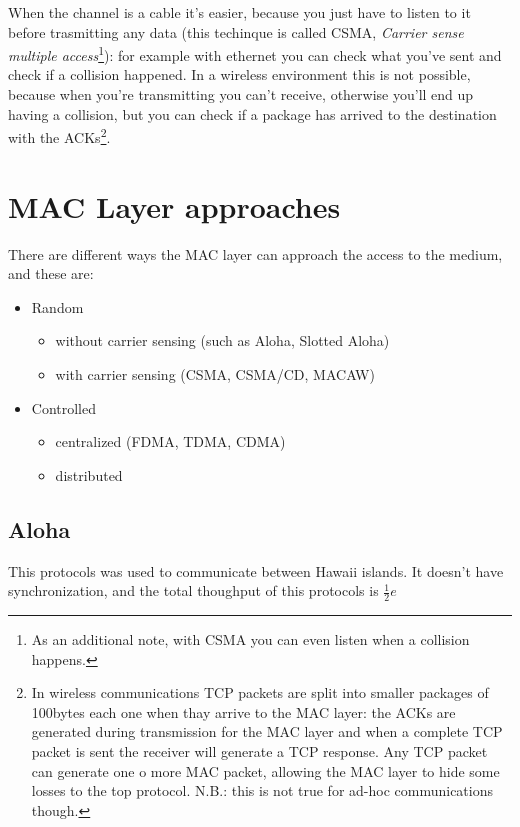 When the channel is a cable it's easier, because you just have to listen to it
before trasmitting any data (this techinque is called CSMA, \textit{Carrier
  sense  multiple access}\footnote{As an additional note, with CSMA you can even listen  when a collision happens.}): for example with ethernet you can check what you've sent and check if a collision happened. In a wireless environment this is not possible, because when you're transmitting you can't receive, otherwise you'll end up having a collision, but you can check if a package has arrived to the destination with the ACKs\footnote{
  In wireless communications TCP packets are split into smaller packages of 100bytes each one when thay arrive to the MAC layer: the ACKs are generated during transmission for the MAC layer and when a complete TCP packet is sent the receiver will generate a TCP response. Any TCP packet can generate one o more MAC packet, allowing the MAC layer to hide some losses to the top protocol. N.B.: this is not true for ad-hoc communications though.
}.

\section{MAC Layer approaches}

There are different ways the MAC layer can approach the access to the medium,
and these are:
\begin{itemize}
\item Random
  \begin{itemize}
  \item without carrier sensing (such as Aloha, Slotted Aloha)
  \item with carrier sensing (CSMA, CSMA/CD, MACAW)
  \end{itemize}
\item Controlled
  \begin{itemize}
  \item centralized (FDMA, TDMA, CDMA)
  \item distributed
  \end{itemize}
\end{itemize}

\subsection{Aloha}

This protocols was used to communicate between Hawaii islands. It doesn't have
synchronization, and the total thoughput of this protocols is $\frac{1}{2}e$

